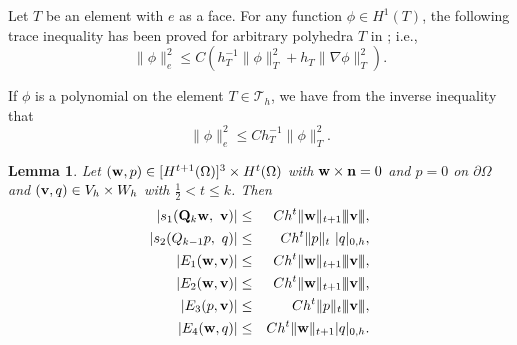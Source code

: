 \documentclass[11pt]{amsart}
\newtheorem{lemma}[theorem]{Lemma}
\newcommand{\bw}{{\bf w}}
\newcommand{\bv}{{\bf v}}
\newcommand{\bQ}{{\bf Q}}
\def\bn{{\bf n}}
\def\3bar{{|\hspace{-.02in}|\hspace{-.02in}|}}
\def\cal#1{\mathcal{#1}}
\begin{document}
Let $T$ be an element with $e$ as a face.  For any function $\phi\in
H^1(T)$, the following trace inequality has been proved for
arbitrary polyhedra  $T$ in \cite{wy-mixed}; i.e.,
\begin{equation}\label{trace}
\|\phi\|_{e}^2 \leq C \left( h_T^{-1} \|\phi\|_T^2 + h_T \|\nabla
\phi\|_{T}^2\right).
\end{equation}

If $\phi$ is a polynomial on the element $T\in{\cal T}_h$, we have
from the inverse inequality that
\begin{equation}\label{trace2}
\|\phi\|_{e}^2 \leq Ch_T^{-1}\|\phi\|_T^2.
\end{equation}

\begin{lemma}\label{Lemma:myestimates}
Let $(\bw,p)\in [H^{t+1}(\Omega)]^3\times H^t(\Omega)$ with $\bw\times\bn=0$ and $p=0$ on $\partial\Omega$ and $(\bv,q)\in
V_h\times W_h$ with $\frac12 <t\le k$. Then
\begin{eqnarray}
|s_1(\bQ_k\bw,\ \bv)| &\le& Ch^t\|\bw\|_{t+1} \3bar\bv\3bar,\label{s--1}\\
|s_2(Q_{k-1} p,\ q)|&\le& Ch^t\|p\|_{t}\ |q|_{0,h},\label{s2}\\
|E_1(\bw,\bv)|&\le& Ch^t\|\bw\|_{t+1} \3bar\bv\3bar,\label{E1}\\
|E_2(\bw,\bv)|&\le& Ch^t\|\bw\|_{t+1} \3bar\bv\3bar,\label{E2}\\
|E_3(p,\bv)|&\le& Ch^t\|p\|_{t}\3bar\bv\3bar, \label{E3}\\
|E_4(\bw,q)|&\le& Ch^t\|\bw\|_{t+1}|q|_{0,h}.\label{E4}
\end{eqnarray}
\end{lemma}
\end{document}
